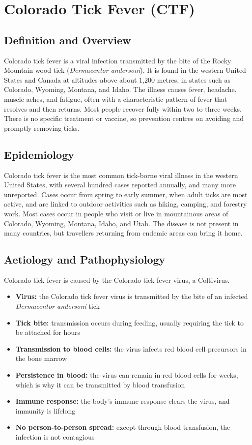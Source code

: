 \chapter{Colorado Tick Fever (CTF)}

\section*{Definition and Overview}
Colorado tick fever is a viral infection transmitted by the bite of the Rocky Mountain wood tick (\textit{Dermacentor andersoni}). It is found in the western United States and Canada at altitudes above about 1,200 metres, in states such as Colorado, Wyoming, Montana, and Idaho. The illness causes fever, headache, muscle aches, and fatigue, often with a characteristic pattern of fever that resolves and then returns. Most people recover fully within two to three weeks. There is no specific treatment or vaccine, so prevention centres on avoiding and promptly removing ticks.

\section*{Epidemiology}
Colorado tick fever is the most common tick-borne viral illness in the western United States, with several hundred cases reported annually, and many more unreported. Cases occur from spring to early summer, when adult ticks are most active, and are linked to outdoor activities such as hiking, camping, and forestry work. Most cases occur in people who visit or live in mountainous areas of Colorado, Wyoming, Montana, Idaho, and Utah. The disease is not present in many countries, but travellers returning from endemic areas can bring it home.

\section*{Aetiology and Pathophysiology}
Colorado tick fever is caused by the Colorado tick fever virus, a Coltivirus.

\begin{itemize}
    \item \textbf{Virus:} the Colorado tick fever virus is transmitted by the bite of an infected \textit{Dermacentor andersoni} tick
    \item \textbf{Tick bite:} transmission occurs during feeding, usually requiring the tick to be attached for hours
    \item \textbf{Transmission to blood cells:} the virus infects red blood cell precursors in the bone marrow
    \item \textbf{Persistence in blood:} the virus can remain in red blood cells for weeks, which is why it can be transmitted by blood transfusion
    \item \textbf{Immune response:} the body's immune response clears the virus, and immunity is lifelong
    \item \textbf{No person-to-person spread:} except through blood transfusion, the infection is not contagious
\end{itemize}

